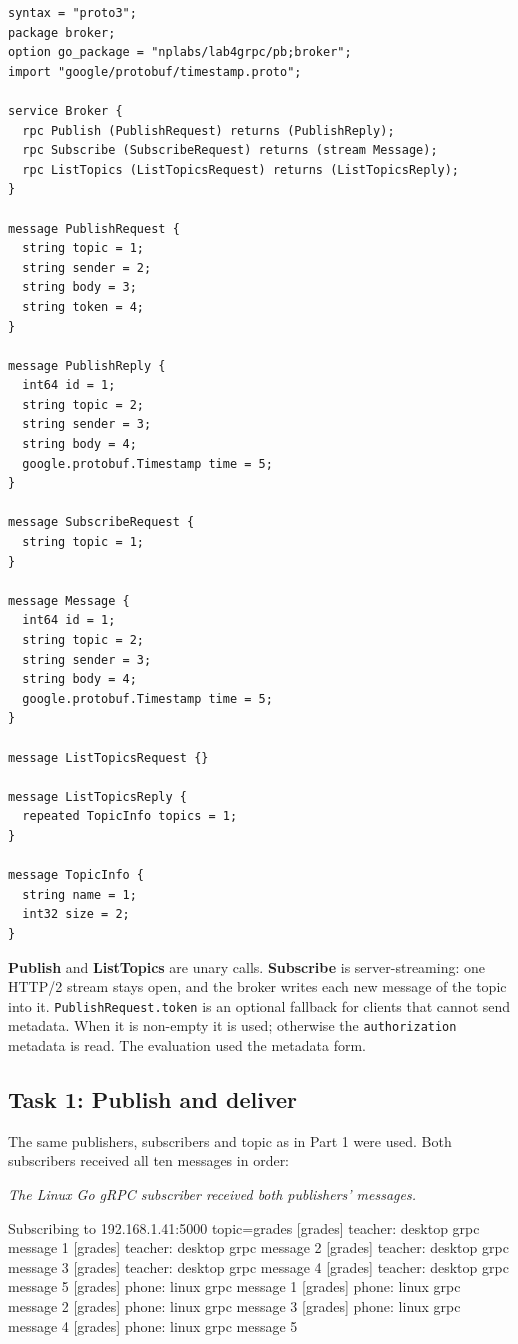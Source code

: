 \documentclass[12pt,a4paper]{article}
\begin{document}
\begin{lstlisting}[caption={The shared Protocol Buffers contract, \texttt{broker.proto}.}]
syntax = "proto3";
package broker;
option go_package = "nplabs/lab4grpc/pb;broker";
import "google/protobuf/timestamp.proto";

service Broker {
  rpc Publish (PublishRequest) returns (PublishReply);
  rpc Subscribe (SubscribeRequest) returns (stream Message);
  rpc ListTopics (ListTopicsRequest) returns (ListTopicsReply);
}

message PublishRequest {
  string topic = 1;
  string sender = 2;
  string body = 3;
  string token = 4;
}

message PublishReply {
  int64 id = 1;
  string topic = 2;
  string sender = 3;
  string body = 4;
  google.protobuf.Timestamp time = 5;
}

message SubscribeRequest {
  string topic = 1;
}

message Message {
  int64 id = 1;
  string topic = 2;
  string sender = 3;
  string body = 4;
  google.protobuf.Timestamp time = 5;
}

message ListTopicsRequest {}

message ListTopicsReply {
  repeated TopicInfo topics = 1;
}

message TopicInfo {
  string name = 1;
  int32 size = 2;
}
\end{lstlisting}

\textbf{Publish} and \textbf{ListTopics} are unary calls. \textbf{Subscribe} is
server-streaming: one HTTP/2 stream stays open, and the broker writes each new
message of the topic into it. \texttt{PublishRequest.token} is an optional
fallback for clients that cannot send metadata. When it is non-empty it is used;
otherwise the \texttt{authorization} metadata is read. The evaluation used the
metadata form.

\subsection{Task 1: Publish and deliver}
The same publishers, subscribers and topic as in Part 1 were used. Both
subscribers received all ten messages in order:

\par\medskip\noindent\textit{The Linux Go gRPC subscriber received both publishers' messages.}\par\nopagebreak
\begin{terminalwindow}[]
Subscribing to 192.168.1.41:5000 topic=grades
[grades] teacher: desktop grpc message 1
[grades] teacher: desktop grpc message 2
[grades] teacher: desktop grpc message 3
[grades] teacher: desktop grpc message 4
[grades] teacher: desktop grpc message 5
[grades] phone: linux grpc message 1
[grades] phone: linux grpc message 2
[grades] phone: linux grpc message 3
[grades] phone: linux grpc message 4
[grades] phone: linux grpc message 5
\end{terminalwindow}
\end{document}
